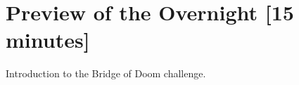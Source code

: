 \documentclass{tufte-handout}
\begin{document}
\section{Preview of the Overnight [15 minutes]}

Introduction to the Bridge of Doom challenge.

\end{document}

